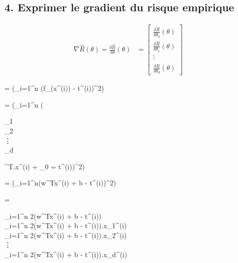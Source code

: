 \documentclass[12pt]{article}
\newenvironment{eqs*}{\begin{equation*}\begin{aligned}}{\end{aligned}\end{equation*}}
\begin{document}
\subsection{4. Exprimer le gradient du risque empirique}
	\begin{align}
	\nabla \hat{R}(\theta) = \frac{\delta\hat{R}}{\delta\theta}(\theta) &= \begin{bmatrix}    														        													\frac{\delta\hat{R}}{\delta\theta_{0}}(\theta) \\
           														\frac{\delta\hat{R}}{\delta\theta_{1}}(\theta) \\
															\vdots \\
           														\frac{\delta\hat{R}}{\delta\theta_{d}}(\theta)
         														\end{bmatrix}
	\end{align}
	
	\begin{eqs*}	
		=  (\sum_{i=1}^{n} (f_{\theta}(x^{(i)}) - t^{(i)})^{2})
	\end{eqs*}

	\begin{eqs*}
		=  (\sum_{i=1}^{n} (\begin{bmatrix}
									\theta_{1} \\
									\theta_{2} \\
									\vdots \\
									\theta_{d}
									\end{bmatrix}^{T}.x^{(i)} + \theta_{0} = t^{(i)})^{2})
	\end{eqs*}

	\begin{eqs*}
		=  (\sum_{i=1}^{n}(w^{T}x^{(i)} + b - t^{(i)})^{2})
	\end{eqs*}

	\begin{eqs*}
		=  \begin{bmatrix}
			\sum_{i=1}^{n} 2(w^{T}x^{(i)} + b - t^{(i)}) \\
			\sum_{i=1}^{n} 2(w^{T}x^{(i)} + b - t^{(i)}).x_{1}^{(i)} \\
			\sum_{i=1}^{n} 2(w^{T}x^{(i)} + b - t^{(i)}).x_{2}^{(i)} \\
			\vdots \\
			\sum_{i=1}^{n} 2(w^{T}x^{(i)} + b - t^{(i)}).x_{d}^{(i)}
			\end{bmatrix}
	\end{eqs*}
	
\end{document}
